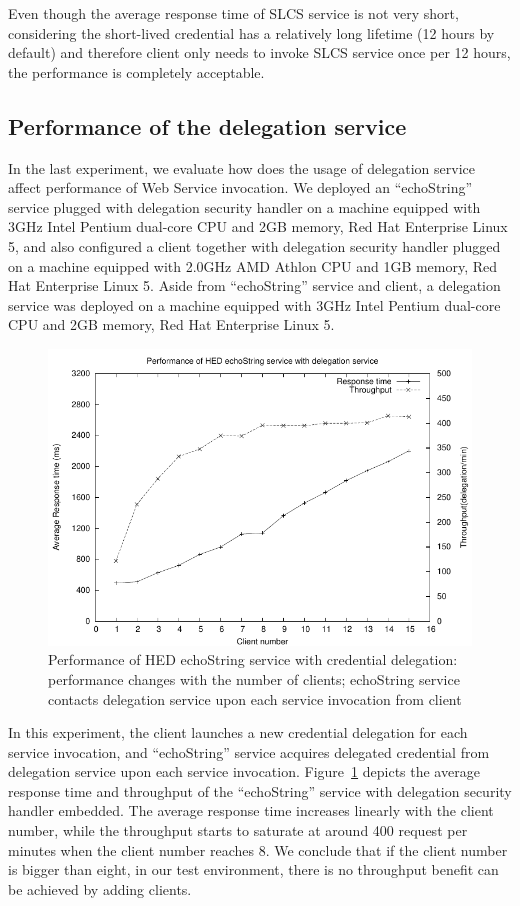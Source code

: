 \documentclass[conference]{IEEEtran}
\begin{document}
Even though the average response time of SLCS service is not very short,
considering the short-lived credential has a relatively long lifetime (12 hours by default) and therefore
client only needs to invoke SLCS service once per 12 hours, the performance is completely acceptable.

\subsection{Performance of the delegation service}
\label{sec:perfdelegserv}

In the last experiment, we evaluate how does the usage of delegation service
affect performance of Web Service invocation. We deployed an ``echoString'' service
plugged with delegation security handler on a machine equipped with 3GHz Intel Pentium dual-core CPU and
2GB memory, Red Hat Enterprise Linux 5, and also configured a client together with delegation
security handler plugged on a machine equipped with 2.0GHz AMD Athlon CPU and 1GB memory, Red Hat
Enterprise Linux 5. Aside from ``echoString'' service and client, a delegation service was deployed on a machine
equipped with 3GHz Intel Pentium dual-core CPU and 2GB memory, Red Hat Enterprise Linux 5.

\begin{figure}
\includegraphics[width=0.9\columnwidth]{Delegation_thread_to_perf.pdf}
\caption{Performance of HED echoString service with credential delegation:
performance changes with the number of clients; echoString service contacts delegation service upon
each service invocation from client}
\label{fig:Delegation_thread_to_perf}
\end{figure}

In this experiment, the client launches a new credential delegation for each
service invocation, and ``echoString'' service acquires delegated credential from delegation service
upon each service invocation.
Figure~\ref{fig:Delegation_thread_to_perf} depicts the average response time and
throughput of the ``echoString'' service with delegation security handler embedded. The
average response time increases linearly with the client number, while the throughput starts to saturate
at around 400 request per minutes when the client number reaches 8.
We conclude that if the client number is bigger than eight, in our test
environment, there is no throughput benefit can be achieved by adding clients.
\end{document}
